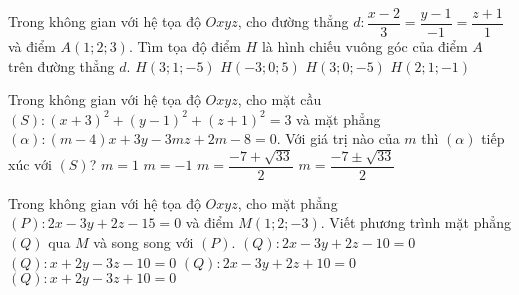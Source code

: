 \begin{ex}%
Trong không gian với hệ tọa độ $Oxyz$, cho đường thẳng $d\colon  \dfrac{x-2}{3}=\dfrac{y-1}{-1}=\dfrac{z+1}{1}$ và điểm $A(1;2;3)$. Tìm tọa độ điểm $H$ là hình chiếu vuông góc của điểm $A$ trên đường thẳng $d$.
\choice
{$H(3;1;-5)$}
{$H(-3;0;5)$}
{$H(3;0;-5)$}
{\True $H(2;1;-1)$}
\end{ex}

\begin{ex}%
Trong không gian với hệ tọa độ $Oxyz$, cho mặt cầu $(S)\colon  (x+3)^2+(y-1)^2+(z+1)^2=3$ và mặt phẳng $(\alpha): (m-4)x+3y-3mz+2m-8=0$. Với giá trị nào của $m$ thì $(\alpha)$ tiếp xúc với $(S)$?
\choice
{\True $m=1$}
{$m=-1$}
{$m=\dfrac{-7+\sqrt{33}}{2}$}
{$m=\dfrac{-7\pm\sqrt{33}}{2}$}
\end{ex}

\begin{ex}%
Trong không gian với hệ tọa độ $Oxyz$, cho mặt phẳng $(P)\colon 2x-3y+2z-15=0$ và điểm $M(1;2;-3)$. Viết phương trình mặt phẳng $(Q)$ qua $M$ và song song với $(P)$.
\choice
{$(Q)\colon  2x-3y+2z-10=0$}
{$(Q)\colon  x+2y-3z-10=0$}
{\True $(Q)\colon  2x-3y+2z+10=0$}
{$(Q)\colon  x+2y-3z+10=0$}
\end{ex}

